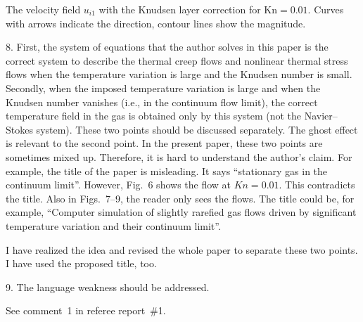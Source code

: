 \documentclass{article}
\newcommand{\Kn}{\mathrm{Kn}}
\begin{document}
\begin{leftbar}
The velocity field \(u_{i1}\) with the Knudsen layer correction for \(\Kn=0.01\).
Curves with arrows indicate the direction, contour lines show the magnitude.
\end{leftbar}

\begin{quoting}
8. First, the system of equations that the author solves in this paper
is the correct system to describe the thermal creep flows and nonlinear
thermal stress flows when the temperature variation is large and the
Knudsen number is small. Secondly, when the imposed temperature
variation is large and when the Knudsen number vanishes (i.e., in the
continuum flow limit), the correct temperature field in the gas is
obtained only by this system (not the Navier--Stokes system). These two
points should be discussed separately. The ghost effect is relevant to
the second point. In the present paper, these two points are sometimes
mixed up. Therefore, it is hard to understand the author's claim. For
example, the title of the paper is misleading. It says ``stationary gas
in the continuum limit''. However, Fig.~6 shows the flow at \(Kn=0.01\).
This contradicts the title. Also in Figs.~7--9, the reader only sees the
flows. The title could be, for example, ``Computer simulation of
slightly rarefied gas flows driven by significant temperature variation
and their continuum limit''.
\end{quoting}

I have realized the idea and revised the whole paper to separate these two points.
I have used the proposed title, too.

\begin{leftbar}
\end{leftbar}

\begin{quoting}
9. The language weakness should be addressed.
\end{quoting}

See comment~1 in referee report~\#1.




\end{document}
